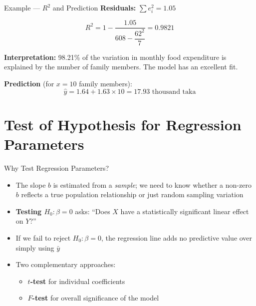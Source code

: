 \documentclass[12pt, aspectratio=169]{beamer}
\begin{document}
    \begin{frame}{Example --- $R^2$ and Prediction}
        \textbf{Residuals:} $\sum e_i^2 = 1.05$

        \[
            R^2 = 1 - \frac{1.05}{608 - \dfrac{62^2}{7}} = 0.9821
        \]

        \textbf{Interpretation:} 98.21\% of the variation in monthly food expenditure is explained by the number of family members. The model has an excellent fit.

        \vspace{0.8em}

        \textbf{Prediction} (for $x = 10$ family members):
        \[
            \hat{y} = 1.64 + 1.63 \times 10 = 17.93 \text{ thousand taka}
        \]
    \end{frame}


    \section{Test of Hypothesis for Regression Parameters}

    \begin{frame}{Why Test Regression Parameters?}
        \begin{itemize}
            \item The slope $b$ is estimated from a \emph{sample}; we need to know whether a non-zero $b$ reflects a true population relationship or just random sampling variation
            \item \textbf{Testing $H_0: \beta = 0$} asks: ``Does $X$ have a statistically significant linear effect on $Y$?''
            \item If we fail to reject $H_0: \beta = 0$, the regression line adds no predictive value over simply using $\bar{y}$
            \item Two complementary approaches:
            \begin{itemize}
                \item \textbf{$t$-test} for individual coefficients
                \item \textbf{$F$-test} for overall significance of the model
            \end{itemize}
        \end{itemize}
    \end{frame}
\end{document}
